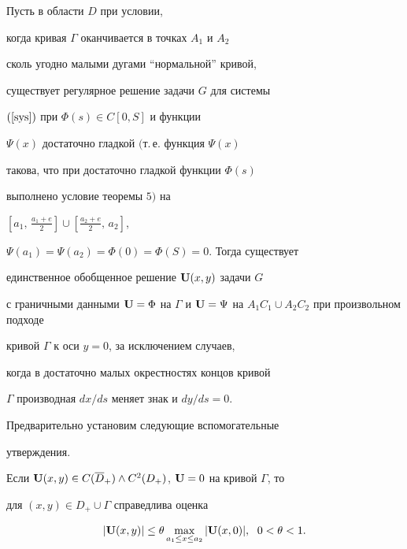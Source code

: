 \begin{thm}


Пусть в области $D$ при условии,


когда кривая $\Gamma$ оканчивается в точках $A_1$ и $A_2$


сколь угодно малыми дугами ``нормальной'' кривой,


существует регулярное решение задачи $G$ для системы


$(\ref{sys})$ при $\Phi(s)\in C[0,S]$ и функции


$\Psi(x)$ достаточно гладкой $($т.\,е. функция $\Psi(x)$


такова, что при достаточно гладкой функции $\Phi(s)$


выполнено условие теоремы $5)$ на


$[a_1,\,\frac{a_1+e}{2}]\cup[\frac{a_2+e}{2},\,a_2]$,


$\Psi(a_1)=\Psi(a_2)=\Phi(0)=\Phi(S)=0$. Тогда существует


единственное обобщенное решение ${\bold U}(x,y)$ задачи $G$


с граничными данными ${\bold U}=\Phi$ на $\Gamma$ и ${\bold


U}=\Psi$ на $A_1C_1 \cup A_2C_2$ при произвольном подходе


кривой $\Gamma$ к оси $y=0$, за исключением случаев,


когда в достаточно малых окрестностях концов кривой


$\Gamma$ производная $dx/ds$ меняет знак и $dy/ds=0$.


\end{thm}





Предварительно установим следующие вспомогательные


утверждения.





\begin{lem}


Если ${\bold U}(x,y)\in C(\overline


D_+)\land C^2(D_+)$, ${\bold U}=0$ на кривой $\Gamma$, то


для $(x,y)\in D_+\cup \Gamma$ справедлива оценка


$$


|{\bold U}(x,y)|\le \theta \max_{a_1\le x\le


a_2}|{\bold U}(x,0)|,\ \; 0<\theta <1.


$$


\end{lem}





